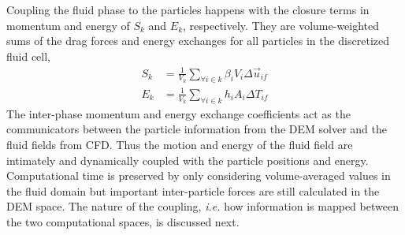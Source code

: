 Coupling the fluid phase to the particles happens with the closure terms in momentum and energy of $S_k$ and $E_k$, respectively. They are volume-weighted sums of the drag forces and energy exchanges for all particles in the discretized fluid cell,
\begin{subequations}\label{eq:cfd-sources}
\begin{align}
	S_k &= \frac{1}{V_k}\sum_{\forall i \in k} \beta_i V_i \Delta \vec{u}_{if} \label{eq:cfd-mom-source}\\
	E_k &= \frac{1}{V_k}\sum_{\forall i \in k} h_i A_i \Delta T_{if}
\end{align}
\end{subequations}
The inter-phase momentum and energy exchange coefficients act as the communicators between the particle information from the DEM solver and the fluid fields from CFD. Thus the motion and energy of the fluid field are intimately and dynamically coupled with the particle positions and energy. Computational time is preserved by only considering volume-averaged values in the fluid domain but important inter-particle forces are still calculated in the DEM space. The nature of the coupling, \textit{i.e.} how information is mapped between the two computational spaces, is discussed next.%





